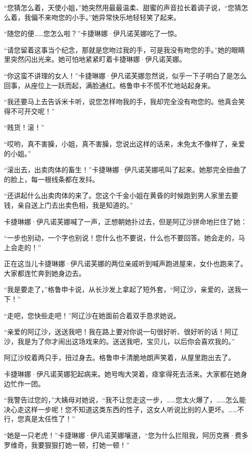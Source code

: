 \par “您猜怎么着，天使小姐，”她突然用最最温柔、甜蜜的声音拉长着调子说，“您猜怎么着，我偏不来吻您的小手。”她异常快乐地轻轻笑了起来。
\par “随您的便……您怎么啦？”卡捷琳娜·伊凡诺芙娜吃了一惊。
\par “请您留着这事当个纪念，那就是您吻过我的手，可是我没有吻您的手。”她的眼睛里突然闪出光来。她可怕地紧紧盯着卡捷琳娜·伊凡诺芙娜。
\par “你这蛮不讲理的女人！”卡捷琳娜·伊凡诺芙娜忽然说，似乎一下子明白了是怎么回事，从座位上一跃而起，满脸通红。格鲁申卡不慌不忙地站起身来。
\par “我还要马上去告诉米卡听，说您怎样吻我的手，我却完全没有吻您的。他真会笑得不可开交呢！”
\par “贱货！滚！”
\par “哎哟，真不害臊，小姐，真不害臊，您说出这样的话来，未免太不像样了，亲爱的小姐。”
\par “滚出去，出卖肉体的畜生！”卡捷琳娜·伊凡诺芙娜吼叫了起来。她那完全扭曲了的脸上，每一根线条都在发抖。
\par “还讲起什么出卖肉体的来了。您这个千金小姐在黄昏的时候跑到男人家里去要钱，亲自送上门去出卖色相，我是知道的。”
\par 卡捷琳娜·伊凡诺芙娜喊了一声，正想朝她扑过去，但是阿辽沙拼命地拦住了她：
\par “一步也别动，一个字也别说！您什么也不要说，什么也不要回答。她会走的，马上会走的！”
\par 正在这当儿卡捷琳娜·伊凡诺芙娜的两位亲戚听到喊声跑进屋来，女仆也跑来了。大家都连忙奔到她身边去。
\par “我是要走了，”格鲁申卡说，从长沙发上拿起了短外套，“阿辽沙，亲爱的，送我一下！”
\par “走吧，您快些走吧！”阿辽沙在她面前合着双手恳求她说。
\par “亲爱的阿辽沙，送送我吧！我在路上要对你说一句很好听、很好听的话！阿辽沙，我是为了你才闹出这场戏来的。送送我吧，宝贝儿，以后你会喜欢我的。”
\par 阿辽沙绞着两只手，扭过身去。格鲁申卡清脆地朗声笑着，从屋里跑出去了。
\par 卡捷琳娜·伊凡诺芙娜犯起病来。她号啕大哭着，痉挛得死去活来。大家都在她身边忙作一团。
\par “我警告过您的，”大姨母对她说，“我不让您走这一步，……您太火爆了，……怎么能决心走这样一步呢！您不知道这类东西的性子，这女人听说比别的人更坏。……不行，您真是太任性了！”
\par “她是一只老虎！”卡捷琳娜·伊凡诺芙娜嚷道，“您为什么拦阻我，阿历克赛·费多罗维奇，我要狠狠打她一顿，打她一顿！”
